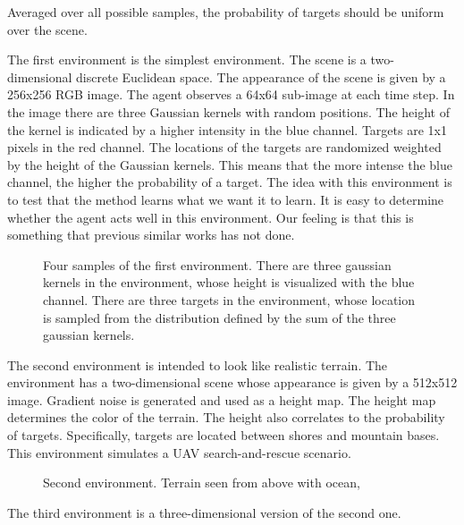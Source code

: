 Averaged over all possible samples, the probability of targets should be uniform over the scene.

The first environment is the simplest environment. 
The scene is a two-dimensional discrete Euclidean space.
The appearance of the scene is given by a 256x256 RGB image.
The agent observes a 64x64 sub-image at each time step.
In the image there are three Gaussian kernels with random positions.
The height of the kernel is indicated by a higher intensity in the blue channel.
Targets are 1x1 pixels in the red channel.
The locations of the targets are randomized weighted by the height of the Gaussian kernels.
This means that the more intense the blue channel, the higher the probability of a target.
The idea with this environment is to test that the method learns what we want it to learn.
It is easy to determine whether the agent acts well in this environment.
Our feeling is that this is something that previous similar works has not done. %

\begin{figure}
    \centering
    
    \label{fig:gaussian}
    \caption{Four samples of the first environment. There are three gaussian kernels in the environment, whose height is visualized with the blue channel. There are three targets in the environment, whose location is sampled from the distribution defined by the sum of the three gaussian kernels.}
\end{figure}

The second environment is intended to look like realistic terrain.
The environment has a two-dimensional scene whose appearance is given by a 512x512 image.
Gradient noise is generated and used as a height map.
The height map determines the color of the terrain.
The height also correlates to the probability of targets.
Specifically, targets are located between shores and mountain bases.
This environment simulates a UAV search-and-rescue scenario.

\begin{figure}
    \centering
    
    \label{fig:terrain}
    \caption{Second environment. Terrain seen from above with ocean, }
\end{figure}

The third environment is a three-dimensional version of the second one.


